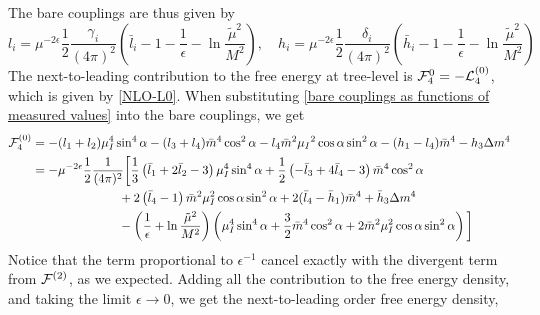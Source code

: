 The bare couplings are thus given by
\begin{equation}
    \label{bare couplings as functions of measured values}
    l_i = \mu^{-2\epsilon} \frac{1}{2} \frac{\gamma_i}{(4 \pi)^2}
    \left(
        \bar l_i -1- \frac{1}{\epsilon} - \ln\frac{\tilde \mu^2}{M^2}
    \right), 
    \quad
    h_i = \mu^{-2\epsilon} \frac{1}{2} \frac{\delta_i}{(4 \pi)^2}
    \left(
        \bar h_i - 1 - \frac{1}{\epsilon} - \ln\frac{\tilde \mu^2}{M^2}
    \right)
\end{equation}
The next-to-leading contribution to the free energy at tree-level is $\mathcal{F}_4^{0} = - \mathcal{L}_4^{(0)}$, which is given by \cref{NLO-L0}.
When substituting \autoref{bare couplings as functions of measured values} into the bare couplings, we get
\begin{align*}
    \mathcal{F}^{(0)}_4
    & = 
    - (l_1 + l_2)\mu_I^4 \sin^4{\alpha}
    - (l_3 + l_4)\bar m^4 \cos^2{\alpha}
    - l_4 \bar m^2 \mu_I{}^2 \cos{\alpha} \sin^2{\alpha}
    -(h_1- l_4) \bar m^4
    - h_3 \Delta m^4
    \\
    & = 
    - \mu^{-2 \epsilon} \frac{1}{2} \frac{1}{(4 \pi)^2}
    \bigg[
        \frac{1}{3}
        \left( 
            \bar l_1 + 2 \bar l_2 - 3
        \right) \mu_I^4 \sin^4 \alpha
        +
        \frac{1}{2}
        \left(
            - \bar l_3 + 4 \bar l_4 - 3
        \right) \bar m^4 \cos^2\alpha
        \\
        & \quad \quad \quad \quad \quad \quad \quad
        + 2 \left(\bar l_4 - 1\right)
        \bar m^2 \mu_I^2 \cos\alpha \sin^2 \alpha
        + 2 (\bar l_4 - \bar h_1) \bar m^4
        + \bar h_3 \Delta m^4
        \\
        & \quad \quad \quad \quad \quad \quad \quad
        - 
        \left(\frac{1}{\epsilon} + \ln \frac{\tilde \mu^2}{M^2}\right) 
        \left(
            \mu_I^4\sin^4\alpha + \frac{3}{2} \bar m^4 \cos^2 \alpha
            + 2 \bar m^2 \mu_I^2 \cos\alpha \sin^2 \alpha
        \right) 
    \bigg] 
\end{align*}
Notice that the term proportional to $\epsilon^{-1}$ cancel exactly with the divergent term from $\mathcal{F}^{(2)}$, as we expected.
Adding all the contribution to the free energy density, and taking the limit $\epsilon \rightarrow 0$, we get the next-to-leading order free energy density,

